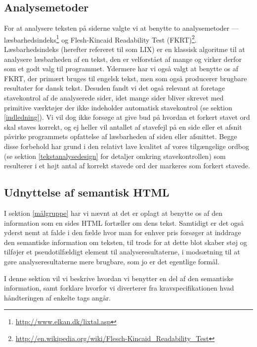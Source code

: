 \documentclass[a4paper,oneside]{memoir}
\begin{document}
\subsection{Analysemetoder}
\label{analysemetoder}
For at analysere teksten på siderne valgte vi at benytte to
analysemetoder ---
læsbarhedsindeks\footnote{\url{http://www.elkan.dk/lixtal.asp}} og
Flesh-Kincaid Readability Test
(FKRT)\footnote{\url{http://en.wikipedia.org/wiki/Flesch-Kincaid_Readability_Test}}.
Læsbarhedsindeks (herefter refereret til som LIX) er en klassisk
algoritme til at analysere læsbarheden af en tekst, den er velforstået
af mange og virker derfor som et godt valg til programmet. Ydermere
har vi også valgt at benytte os af FKRT, der primært bruges til
engelsk tekst, men som også producerer brugbare resultater for dansk
tekst. Desuden fandt vi det også relevant at foretage stavekontrol af
de analyserede sider, idet mange sider bliver skrevet med primitive
værktøjer der ikke indeholder automatisk stavekontrol (se sektion
\ref{indledning}). Vi vil dog ikke forsøge at give bud på hvordan et
forkert stavet ord skal staves korrekt, og ej heller vil antallet af
stavefejl på en side eller et afsnit påvirke programmets opfattelse af
læsbarheden af siden eller afsnittet. Begge disse forbehold har grund
i den relativt lave kvalitet af vores tilgængelige ordbog (se sektion
\ref{tekstanalysedesign} for detaljer omkring stavekontrollen) som
resulterer i et højt antal af korrekt stavede ord der markeres som
forkert stavede.

\subsection{Udnyttelse af semantisk HTML}
\label{semantiskhtml}
I sektion \ref{målgruppe} har vi nævnt at det er oplagt at benytte os
af den information som en sides HTML fortæller om dens
tekst. Samtidigt er det også yderst nemt at falde i den fælde hvor man
for enhver pris forsøger at inddrage den semantiske information om
teksten, til trods for at dette blot skaber støj og tilføjer et
pseudotilfældigt element til analyseresultaterne, i modsætning til at
gøre analyseresultaterne mere brugbare, som jo er det egentlige
formål.

I denne sektion vil vi beskrive hvordan vi benytter en del af den
semantiske information, samt forklare hvorfor vi diverterer fra
kravspecifikationen hvad håndteringen af enkelte tags angår.
\end{document}
